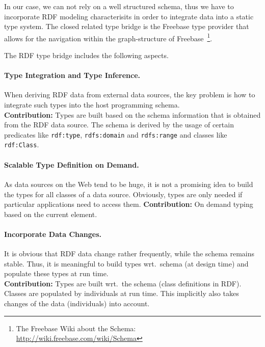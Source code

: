 \documentclass{llncs} %
\begin{document}
In our case, we can not rely on a well structured schema, thus we have to
incorporate RDF modeling characterisits in order to integrate data into
a static type system. The closed related type bridge is the Freebase  
type provider that allows for the navigation within the graph-structure of
Freebase~\footnote{The Freebase Wiki about the Schema: \url{http://wiki.freebase.com/wiki/Schema}}.

The RDF type bridge includes the following aspects.


\paragraph*{\bf Type Integration and Type Inference.}
When deriving RDF data from external data sources, the key problem is how to integrate
such types into the host programming schema. \\
\textbf{Contribution:} Types are built based on the schema information that is obtained
from the RDF data source. The schema is derived by the 
usage of certain predicates like \texttt{rdf:type}, \texttt{rdfs:domain} and \texttt{rdfs:range}
and classes like \texttt{rdf:Class}.

\paragraph{\bf Scalable Type Definition on Demand.}
As data sources on the Web tend to be huge, it is not a promising idea to
build the types for all classes of a data source.
Obviously, types are only needed if particular applications need to access them.
\textbf{Contribution:} On demand typing based on the current element. \\


\paragraph*{\bf Incorporate Data Changes.}
It is obvious that RDF data change rather frequently, while the
schema remains stable. Thus, it is meaningful to build types wrt.\ schema (at design time)
and populate these types at run time.\\
\textbf{Contribution:} Types are built wrt.\ the schema (class definitions in RDF).
Classes are populated by individuals at run time.
This implicitly also takes changes of the data (individuals) into account. \\


\end{document}
